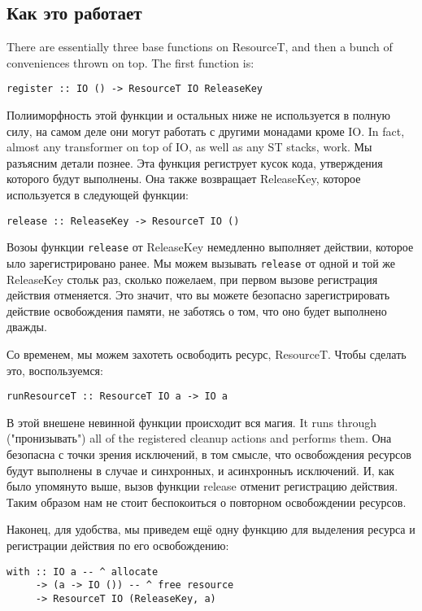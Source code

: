 \subsection{Как это работает}

There are essentially three base functions on ResourceT, and then a bunch of
conveniences thrown on top. The first function is:
\begin{lstlisting}
register :: IO () -> ResourceT IO ReleaseKey
\end{lstlisting}
Полииморфность этой функции и остальных ниже не используется в полную силу, на самом деле
они могут работать с другими монадами кроме IO. In fact, almost any transformer on top of
IO, as well as any ST stacks, work. Мы разъясним детали познее.
Эта функция региструет кусок кода, утверждения которого будут выполнены. Она также
возвращает ReleaseKey, которое используется в следующей функции:
\begin{lstlisting}release :: ReleaseKey -> ResourceT IO ()
\end{lstlisting}
Возоы функции \verb=release= от ReleaseKey немедленно выполняет действии, которое ыло
зарегистрировано ранее. Мы можем вызывать \verb=release= от одной и той же ReleaseKey
стольк раз, сколько пожелаем, при первом вызове регистрация действия отменяется. Это
значит, что вы можете безопасно зарегистрировать действие освобождения памяти, не
заботясь о том, что оно будет выполнено дважды.

Со временем, мы можем захотеть освободить ресурс, ResourceT. Чтобы сделать это,
воспользуемся:
\begin{lstlisting}
runResourceT :: ResourceT IO a -> IO a
\end{lstlisting}
В этой внешене невинной функции происходит вся магия. 
 It runs through ("пронизывать") all of
the
registered cleanup actions and performs them. Она безопасна с точки зрения исключений, в
том смысле, что освобождения ресурсов будут выполнены в случае и синхронных, и
асинхронныъ исключений. И, как было упомянуто выше, вызов функции release отменит
регистрацию действия. Таким образом нам не стоит беспокоиться о повторном освобождении
ресурсов.

Наконец, для удобства, мы приведем ещё одну функцию для выделения ресурса и регистрации
действия по его освобождению:
\begin{lstlisting}
with :: IO a -- ^ allocate
     -> (a -> IO ()) -- ^ free resource
     -> ResourceT IO (ReleaseKey, a)
\end{lstlisting}

